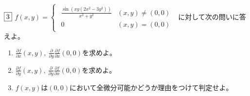 \documentclass[dvipdfmx]{jsreport}
\begin{document}
\begin{tcolorbox} %
	$\fbox{3}$ 
$f(x, y)= 
\begin{cases}
\begin{matrix}
	\frac{\sin{(xy(2x^2- 3y^2))}}{x^2+ y^2}& (x, y)\ne (0, 0)\\
	0& (x, y)= (0, 0)
\end{matrix}
\end{cases}
$
	に対して次の問いに答えよ。
\begin{enumerate}
	\item $\frac{\partial f}{\partial x}(x, y),\ \frac{\partial}{\partial y}\frac{\partial f}{\partial x}(0, 0)$を求めよ。
	\item $\frac{\partial f}{\partial y}(x, y),\ \frac{\partial}{\partial y}\frac{\partial f}{\partial x}(0, 0)$を求めよ。
	\item $f(x, y)$は$(0, 0)$において全微分可能かどうか理由をつけて判定せよ。
\end{enumerate}
\end{tcolorbox}
\end{document}
